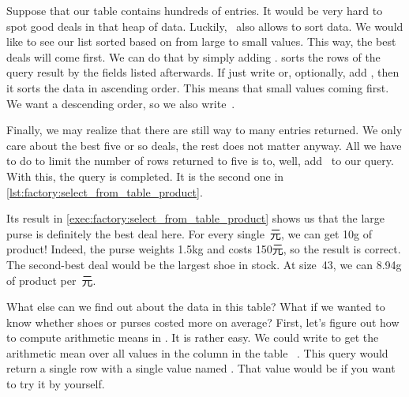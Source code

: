 %
%
Suppose that our table  contains hundreds of entries.
It would be very hard to spot good deals in that heap of data.
Luckily, \sql\ also allows to sort data.
We would like to see our list sorted based on  from large to small values.
This way, the best deals will come first.
We can do that by simply adding .
 sorts the rows of the query result by the fields listed afterwards.
If just write  or, optionally, add , then it sorts the data in ascending order.
This means that small values coming first.
We want a descending order, so we also write~.

Finally, we may realize that there are still way to many entries returned.
We only care about the best five or so deals, the rest does not matter anyway.
All we have to do to limit the number of rows returned to five is to, well, add~ to our query.
With this, the query is completed.
It is the second one in \cref{lst:factory:select_from_table_product}.

Its result in \cref{exec:factory:select_from_table_product} shows us that the large purse is definitely the best deal here.
For every single~元, we can get 10g of product!
Indeed, the purse weights 1.5kg and costs 150元, so the result is correct.
The second-best deal would be the largest shoe in stock.
At size~43, we can 8.94g of product per~元.

What else can we find out about the data in this table?
What if we wanted to know whether shoes or purses costed more on average?
First, let's figure out how to compute arithmetic means in \sql.
It is rather easy.
We could write  to get the arithmetic mean over all values in the column  in the table ~\cite{PGDG:PD:AF}.
This query would return a single row with a single value named .
That value would be  if you want to try it by yourself.

